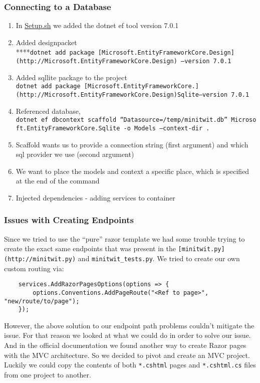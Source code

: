 \subsubsection{Connecting to a
Database}
\label{log:connecting-to-a-database}

\begin{enumerate}
    \item In \href{http://Setup.sh}{Setup.sh} we added the dotnet ef tool version 7.0.1
    \item Added designpacket ****\texttt{dotnet\ add\ package\ {[}Microsoft.EntityFrameworkCore.Design{]}(http://Microsoft.EntityFrameworkCore.Design)\ —version\ 7.0.1}
    \item Added sqllite package to the project \texttt{dotnet\ add\ package\ {[}Microsoft.EntityFrameworkCore.{]}(http://Microsoft.EntityFrameworkCore.Design)Sqlite—version\ 7.0.1}
    \item Referenced database, \texttt{dotnet\ ef\ dbcontext\ scaffold\ “Datasource=/temp/minitwit.db”\ Microsoft.EntityFrameworkCore.Sqlite\ -o\ Models\ —context-dir\ .}
    \item Scaffold wants us to provide a connection string (first argument) and which sql provider we use (second argument)
    \item We want to place the models and context a specific place, which is specified at the end of the command
    \item Injected dependencies - adding services to container
\end{enumerate}

\subsubsection{Issues with Creating
Endpoints}
\label{log:issues-with-creating-endpoints}

Since we tried to use the ``pure'' razor template we had some trouble trying to create the exact same endpoints that was present in the \texttt{{[}minitwit.py{]}(http://minitwit.py)} and \texttt{minitwit\_tests.py}. We tried to create our own custom routing via:

\begin{verbatim}
    services.AddRazorPagesOptions(options => {
        options.Conventions.AddPageRoute("<Ref to page>", "new/route/to/page");
    });
\end{verbatim}

However, the above solution to our endpoint path problems couldn't mitigate the issue. For that reason we looked at what we could do in order to solve our issue. And in the official documentation we found another way to create Razor pages with the MVC architecture. So we decided to pivot and create an MVC project. Luckily we could copy the contents of both \texttt{*.cshtml} pages and \texttt{*.cshtml.cs} files from one project to another.

